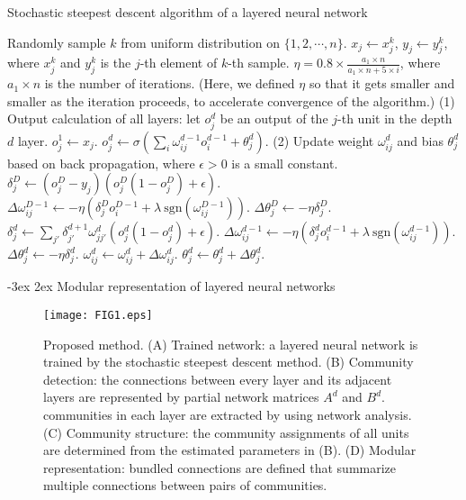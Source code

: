 \documentclass[12pt]{article} %
\makeatletter
\renewcommand\section{\@startsection {section}{1}%
{\z@}%
{-3ex}%
{2ex}%
{\normalfont\normalsize\bfseries}}
\makeatother
\begin{document}
\begin{algorithm}
\caption{Stochastic steepest descent algorithm of a layered neural network}
\label{alg_BP}
\begin{algorithmic}
	\STATE Randomly sample $k$ from uniform distribution on $\{1, 2, \cdots, n\}$.
	\STATE $x_j \gets x^k_j$,
	\STATE $y_j \gets y^k_j$,
	\STATE where $x^k_j$ and $y^k_j$ is the $j$-th element of $k$-th sample.
	\STATE $\eta =0.8 \times \frac{a_1\times n}{a_1\times n+5\times i}$,
	\STATE where $a_1\times n$ is the number of iterations. (Here, we defined $\eta$ so that it gets smaller and smaller as the iteration proceeds, to accelerate convergence of the algorithm.)
	\STATE (1) Output calculation of all layers: let $o^d_j$ be an output of the $j$-th unit in the depth $d$ layer.
	\STATE $o^1_j \gets x_j$.
		\STATE $o^d_j \gets \sigma (\sum_i \omega^{d-1}_{ij} o^{d-1}_i +\theta^d_j)$.
	\ENDFOR
	\STATE (2) Update weight $\omega^d_{ij}$ and bias $\theta^d_j$ based on back propagation, where $\epsilon>0$ is a small constant.
	\STATE $\delta^{D}_j \gets (o^{D}_j-y_j)(o^{D}_j(1-o^{D}_j)+\epsilon)$.
	\STATE $\Delta \omega^{D-1}_{ij} \gets -\eta (\delta^{D}_j o^{D-1}_i+\lambda \ \mathrm{sgn}(\omega^{D-1}_{ij}))$. 
	\STATE $\Delta \theta^{D}_j \gets -\eta \delta^{D}_j$.
		\STATE $\delta^d_j \gets \sum_{j'} \delta^{d+1}_{j'} \omega^d_{jj'} (o^d_j (1-o^d_j)+\epsilon)$.
		\STATE $\Delta \omega^{d-1}_{ij} \gets -\eta (\delta^d_j o^{d-1}_i+\lambda \ \mathrm{sgn}(\omega^{d-1}_{ij}))$.
	\STATE $\Delta \theta^d_j \gets -\eta \delta^d_j$.
	\ENDFOR
	\STATE $\omega^d_{ij}\gets \omega^d_{ij}+\Delta \omega^d_{ij}$.
	\STATE $\theta^d_j \gets \theta^d_j+\Delta \theta^d_j$.
\ENDFOR
\end{algorithmic}
\end{algorithm}

\section{Modular representation of layered neural networks} %
\label{sec:communitydetect}

\begin{figure*}
  \centering
  \texttt{[image: FIG1.eps]}
  \caption{Proposed method. 
(A) Trained network: a layered neural network is trained by the stochastic steepest descent method. 
(B) Community detection: the connections between every layer and its adjacent layers are represented by partial network matrices $A^d$ and $B^d$. communities in each layer are extracted by using network analysis. 
(C) Community structure: the community assignments of all units are determined from the estimated parameters in (B). 
(D) Modular representation: bundled connections are defined that summarize multiple connections between pairs of communities. 
}
  \label{fig:com}
\end{figure*}
\end{document}

